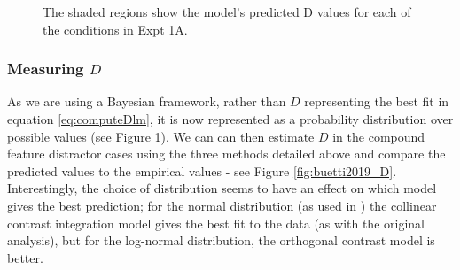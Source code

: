 \documentclass[smallextended]{svjour3}       %
\begin{document}
\begin{figure}
\centering
{}
\caption{The shaded regions show the model's predicted D values for each of the conditions in Expt 1A.}
\label{fig:buetti2019_a1}
\end{figure}

\subsubsection{Measuring $D$}

As we are using a Bayesian framework, rather than $D$ representing the best fit in equation \ref{eq:computeDlm}, it is now represented as a probability distribution over possible values (see Figure \ref{fig:buetti2019_a1}). We can can then estimate $D$ in the compound feature distractor cases using the three methods detailed above and compare the predicted values to the empirical values - see Figure \ref{fig:buetti2019_D}. Interestingly, the choice of distribution seems to have an effect on which model gives the best prediction; for the normal distribution (as used in \cite{buetti2019predicting}) the collinear contrast integration model gives the best fit to the data (as with the original analysis), but for the log-normal distribution, the orthogonal contrast model is better.
\end{document}
